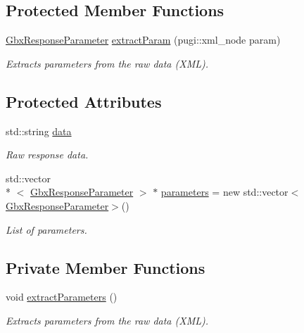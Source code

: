 \subsection*{Protected Member Functions}
\begin{DoxyCompactItemize}
\item 
\hyperlink{classGbxResponseParameter}{Gbx\-Response\-Parameter} \hyperlink{classGbxServerResponse_a22433a652ce9d4c7e9b834aa60c93c37}{extract\-Param} (pugi\-::xml\-\_\-node param)
\begin{DoxyCompactList}\small\item\em Extracts parameters from the raw data (X\-M\-L). \end{DoxyCompactList}\end{DoxyCompactItemize}
\subsection*{Protected Attributes}
\begin{DoxyCompactItemize}
\item 
std\-::string \hyperlink{classGbxServerResponse_a91567866239d733819125c3b3b9948c6}{data}
\begin{DoxyCompactList}\small\item\em Raw response data. \end{DoxyCompactList}\item 
std\-::vector\\*
$<$ \hyperlink{classGbxResponseParameter}{Gbx\-Response\-Parameter} $>$ $\ast$ \hyperlink{classGbxServerResponse_ad6fef5319c4da9461f4cd0d72d8b5ee8}{parameters} = new std\-::vector$<$\hyperlink{classGbxResponseParameter}{Gbx\-Response\-Parameter}$>$()
\begin{DoxyCompactList}\small\item\em List of parameters. \end{DoxyCompactList}\end{DoxyCompactItemize}
\subsection*{Private Member Functions}
\begin{DoxyCompactItemize}
\item 
void \hyperlink{classGbxResponse_a3cd4d6c5458fcd5359b8f5d9921a2a9b}{extract\-Parameters} ()
\begin{DoxyCompactList}\small\item\em Extracts parameters from the raw data (X\-M\-L). \end{DoxyCompactList}\end{DoxyCompactItemize}
